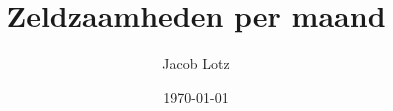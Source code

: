 \documentclass[11pt]{article}
\title{Zeldzaamheden per maand}
\author{Jacob Lotz}
\date{\today}
\begin{document}
\begin{multicols}{2}

	

\end{multicols}
\end{document}
